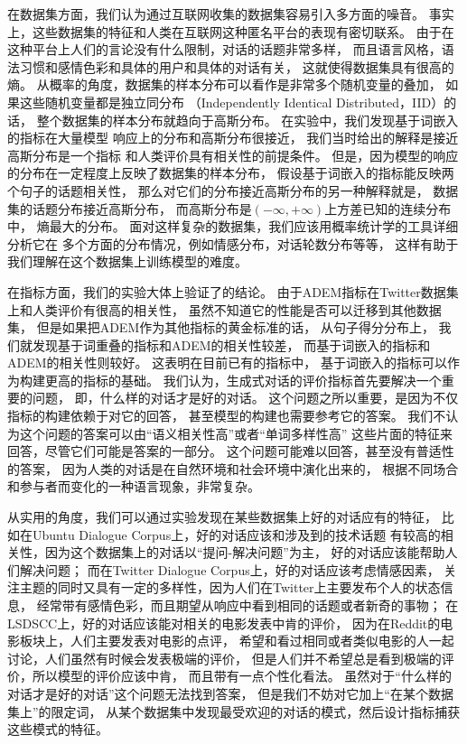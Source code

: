 在数据集方面，我们认为通过互联网收集的数据集容易引入多方面的噪音。
事实上，这些数据集的特征和人类在互联网这种匿名平台的表现有密切联系。
由于在这种平台上人们的言论没有什么限制，对话的话题非常多样，
而且语言风格，语法习惯和感情色彩和具体的用户和具体的对话有关，
这就使得数据集具有很高的熵。
从概率的角度，数据集的样本分布可以看作是非常多个随机变量的叠加，
如果这些随机变量都是独立同分布
（Independently Identical Distributed，IID）的话，
整个数据集的样本分布就趋向于高斯分布。
在实验中，我们发现基于词嵌入的指标在大量模型
响应上的分布和高斯分布很接近，
我们当时给出的解释是接近高斯分布是一个指标
和人类评价具有相关性的前提条件。
但是，因为模型的响应的分布在一定程度上反映了数据集的样本分布，
假设基于词嵌入的指标能反映两个句子的话题相关性，
那么对它们的分布接近高斯分布的另一种解释就是，
数据集的话题分布接近高斯分布，
而高斯分布是$(-\infty, +\infty)$上方差已知的连续分布中，
熵最大的分布。
面对这样复杂的数据集，我们应该用概率统计学的工具详细分析它在
多个方面的分布情况，例如情感分布，对话轮数分布等等，
这样有助于我们理解在这个数据集上训练模型的难度。

在指标方面，我们的实验大体上验证了\cite{HowNot}的结论。
由于ADEM指标在Twitter数据集上和人类评价有很高的相关性，
虽然不知道它的性能是否可以迁移到其他数据集，
但是如果把ADEM作为其他指标的黄金标准的话，
从句子得分分布上，
我们就发现基于词重叠的指标和ADEM的相关性较差，
而基于词嵌入的指标和ADEM的相关性则较好。
这表明在目前已有的指标中，
基于词嵌入的指标可以作为构建更高的指标的基础。
我们认为，生成式对话的评价指标首先要解决一个重要的问题，
即，什么样的对话才是好的对话。
这个问题之所以重要，是因为不仅指标的构建依赖于对它的回答，
甚至模型的构建也需要参考它的答案。
我们不认为这个问题的答案可以由“语义相关性高”或者“单词多样性高”
这些片面的特征来回答，尽管它们可能是答案的一部分。
这个问题可能难以回答，甚至没有普适性的答案，
因为人类的对话是在自然环境和社会环境中演化出来的，
根据不同场合和参与者而变化的一种语言现象，非常复杂。

从实用的角度，我们可以通过实验发现在某些数据集上好的对话应有的特征，
比如在Ubuntu Dialogue Corpus上，好的对话应该和涉及到的技术话题
有较高的相关性，因为这个数据集上的对话以“提问-解决问题”为主，
好的对话应该能帮助人们解决问题；
而在Twitter Dialogue Corpus上，好的对话应该考虑情感因素，
关注主题的同时又具有一定的多样性，因为人们在Twitter上主要发布个人的状态信息，
经常带有感情色彩，而且期望从响应中看到相同的话题或者新奇的事物；
在LSDSCC上，好的对话应该能对相关的电影发表中肯的评价，
因为在Reddit的电影板块上，人们主要发表对电影的点评，
希望和看过相同或者类似电影的人一起讨论，人们虽然有时候会发表极端的评价，
但是人们并不希望总是看到极端的评价，所以模型的评价应该中肯，
而且带有一点个性化看法。
虽然对于“什么样的对话才是好的对话”这个问题无法找到答案，
但是我们不妨对它加上“在某个数据集上”的限定词，
从某个数据集中发现最受欢迎的对话的模式，然后设计指标捕获这些模式的特征。

